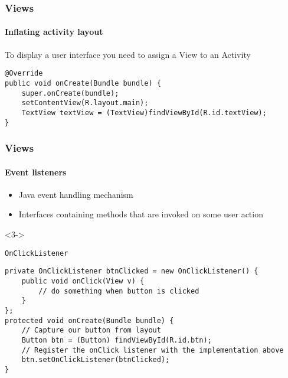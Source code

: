 %
%

\begin{frame}[fragile]
  \frametitle{Views}
  \framesubtitle{Inflating activity layout}

  To display a user interface you need to assign a View to an Activity

\begin{lstlisting}
@Override
public void onCreate(Bundle bundle) {
    super.onCreate(bundle);
    setContentView(R.layout.main);
    TextView textView = (TextView)findViewById(R.id.textView);
}
\end{lstlisting}


\end{frame}


\begin{frame}[fragile]
  \frametitle{Views}
  \framesubtitle{Event listeners}

  \begin{itemize}
  \item<1-> Java event handling mechanism
  \item<2-> Interfaces containing methods that are invoked on some
    user action
  \end{itemize}
  \begin{onlyenv}<3->
  \begin{exampleblock}{\texttt{OnClickListener}}
\begin{lstlisting}
private OnClickListener btnClicked = new OnClickListener() {
    public void onClick(View v) {
        // do something when button is clicked
    }
};
protected void onCreate(Bundle bundle) {
    // Capture our button from layout
    Button btn = (Button) findViewById(R.id.btn);
    // Register the onClick listener with the implementation above
    btn.setOnClickListener(btnClicked);
}
\end{lstlisting}
  \end{exampleblock}
  \end{onlyenv}

\end{frame}

